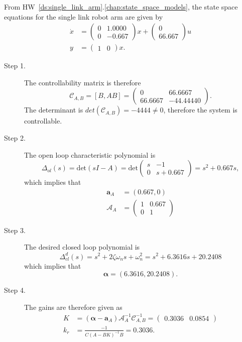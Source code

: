
From HW~\ref{ds:single_link_arm}.\ref{chap:state_space_models}, the state space equations for the single link robot arm are given by
\begin{align*}
\dot{x} &= \begin{pmatrix} 0 &   1.0000 \\ 0 &  -0.667 \end{pmatrix}x + \begin{pmatrix} 0 \\ 66.667 \end{pmatrix} u \\
y &= \begin{pmatrix}1 & 0 \end{pmatrix}x.
\end{align*}
\begin{description}
\item[Step 1.] 
The controllability matrix is therefore
\[
\mathcal{C}_{A,B} = [B, AB] = \begin{pmatrix}  0 & 66.6667 \\ 66.6667 &  -44.44440 \end{pmatrix}.
\]
The determinant is $det(\mathcal{C}_{A,B})=-4444\neq 0$, therefore the system is controllable.  
\item[Step 2.] The open loop characteristic polynomial is
\[
\Delta_{ol}(s)=\text{det}(sI-A) = \text{det}\begin{pmatrix} s & -1 \\ 0 & s+0.667 \end{pmatrix} = s^2 +0.667 s,
\]
which implies that
\begin{align*}
\mathbf{a}_A &= (0.667, 0) \\
\mathcal{A}_A &= \begin{pmatrix} 
1 & 0.667 \\ 0 & 1
\end{pmatrix}
\end{align*}

\item[Step 3.] The desired closed loop polynomial is
\[
\Delta_{cl}^d(s) = s^2+2\zeta\omega_n s + \omega_n^2=s^2+6.3616s+20.2408       
\]
which implies that
\[
\boldsymbol{\alpha} = (6.3616, 20.2408).
\]

\item[Step 4.]
The gains are therefore given as
\begin{align*}
K &= (\boldsymbol{\alpha}-\mathbf{a}_A)\mathcal{A}_A^{-1}\mathcal{C}_{A,B}^{-1} 
   = \begin{pmatrix} 0.3036  &  0.0854 \end{pmatrix} \\
k_r &= \frac{-1}{C(A-BK)^{-1}B} 
     = 0.3036.
\end{align*}
\end{description}

